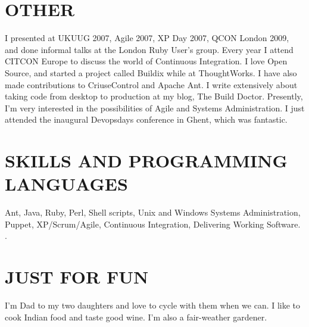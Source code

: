 \documentclass{res}
\begin{document}
\begin{resume}
	   
\section{OTHER}          
    I presented at UKUUG 2007, Agile 2007, XP Day 2007, QCON London 2009, and done informal talks at the London Ruby User's group.  Every year I attend CITCON Europe to discuss the world of Continuous Integration.  I love Open Source, and started a project called Buildix while at ThoughtWorks.  I have also made contributions to CriuseControl and Apache Ant.  I write extensively about taking code from desktop to production at my blog, The Build Doctor.  Presently, I'm very interested in the possibilities of Agile and Systems Administration.  I just attended the inaugural Devopsdays conference in Ghent, which was fantastic.
 

\section{SKILLS AND PROGRAMMING LANGUAGES}          
    Ant, Java, Ruby, Perl, Shell scripts, Unix and Windows Systems Administration, Puppet, XP/Scrum/Agile, Continuous Integration, Delivering Working Software.
.
     
\section{JUST FOR FUN}          
    I'm Dad to my two daughters and love to cycle with them when we can. I like to cook Indian food and taste good wine.  I'm also a fair-weather gardener.


\end{resume}
\end{document}
